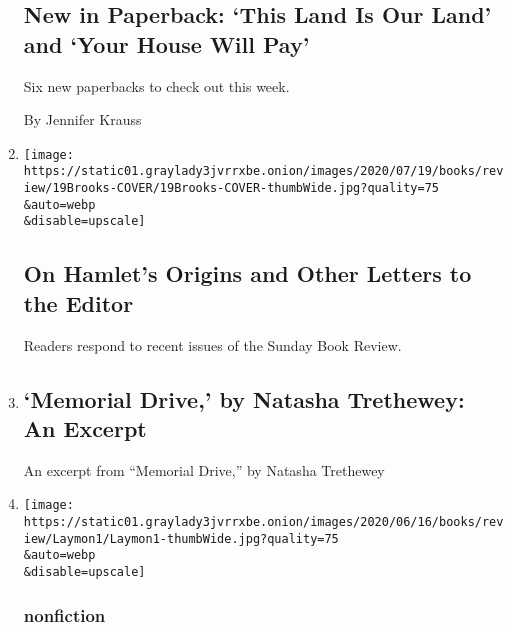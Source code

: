 \begin{enumerate}
  \hypertarget{new-in-paperback-this-land-is-our-land-and-your-house-will-pay}{%
  \subsection{New in Paperback: `This Land Is Our Land' and `Your House
  Will
  Pay'}\label{new-in-paperback-this-land-is-our-land-and-your-house-will-pay}}

  Six new paperbacks to check out this week.

  By Jennifer Krauss
\item
  \href{/2020/07/31/books/review/on-hamlets-origins-and-other-letters-to-the-editor.html}{}

  \texttt{[image: https://static01.graylady3jvrrxbe.onion/images/2020/07/19/books/review/19Brooks-COVER/19Brooks-COVER-thumbWide.jpg?quality=75\\\&auto=webp\\\&disable=upscale]}

  \hypertarget{on-hamlets-origins-and-other-letters-to-the-editor}{%
  \subsection{On Hamlet's Origins and Other Letters to the
  Editor}\label{on-hamlets-origins-and-other-letters-to-the-editor}}

  Readers respond to recent issues of the Sunday Book Review.
\item
  \href{/2020/07/30/books/review/memorial-drive-by-natasha-trethewey-an-excerpt.html}{}

  \hypertarget{memorial-drive-by-natasha-trethewey-an-excerpt}{%
  \subsection{`Memorial Drive,' by Natasha Trethewey: An
  Excerpt}\label{memorial-drive-by-natasha-trethewey-an-excerpt}}

  An excerpt from ``Memorial Drive,'' by Natasha Trethewey
\item
  \href{/2020/07/30/books/review/memorial-drive-natastha-trethewey.html}{}

  \texttt{[image: https://static01.graylady3jvrrxbe.onion/images/2020/06/16/books/review/Laymon1/Laymon1-thumbWide.jpg?quality=75\\\&auto=webp\\\&disable=upscale]}

  \hypertarget{nonfiction-4}{%
  \subsubsection{nonfiction}\label{nonfiction-4}}


\end{enumerate}
